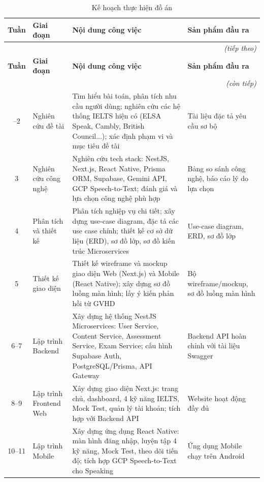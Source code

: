 \documentclass[a4paper,12pt]{extreport}
\begin{document}
\renewcommand{\arraystretch}{1.3}
\begin{longtable}{|c|p{4.0cm}|p{5.5cm}|p{3.5cm}|}
    \caption{Kế hoạch thực hiện đồ án}
    \label{tab:kehoach} \\
    \hline
    \textbf{Tuần} & \textbf{Giai đoạn} & \textbf{Nội dung công việc} & \textbf{Sản phẩm đầu ra} \\ \hline
    \endfirsthead
    \multicolumn{4}{r}{\footnotesize\textit{(tiếp theo)}} \\
    \hline
    \textbf{Tuần} & \textbf{Giai đoạn} & \textbf{Nội dung công việc} & \textbf{Sản phẩm đầu ra} \\ \hline
    \endhead
    \hline \multicolumn{4}{r}{\footnotesize\textit{(còn tiếp)}} \\
    \endfoot
    \hline
    \endlastfoot
    1--2 & Nghiên cứu đề tài & Tìm hiểu bài toán, phân tích nhu cầu người dùng; nghiên cứu các hệ thống IELTS hiện có (ELSA Speak, Cambly, British Council...); xác định phạm vi và mục tiêu đề tài & Tài liệu đặc tả yêu cầu sơ bộ \\ \hline
    3 & Nghiên cứu công nghệ & Nghiên cứu tech stack: NestJS, Next.js, React Native, Prisma ORM, Supabase, Gemini API, GCP Speech-to-Text; đánh giá và lựa chọn công nghệ phù hợp & Bảng so sánh công nghệ, báo cáo lý do lựa chọn \\ \hline
    4 & Phân tích và thiết kế & Phân tích nghiệp vụ chi tiết; xây dựng use-case diagram, đặc tả các use case chính; thiết kế cơ sở dữ liệu (ERD), sơ đồ lớp, sơ đồ kiến trúc Microservices & Use-case diagram, ERD, sơ đồ lớp \\ \hline
    5 & Thiết kế giao diện & Thiết kế wireframe và mockup giao diện Web (Next.js) và Mobile (React Native); xây dựng sơ đồ luồng màn hình; lấy ý kiến phản hồi từ GVHD & Bộ wireframe/mockup, sơ đồ luồng màn hình \\ \hline
    6--7 & Lập trình Backend & Xây dựng hệ thống NestJS Microservices: User Service, Content Service, Assessment Service, Exam Service; cấu hình Supabase Auth, PostgreSQL/Prisma, API Gateway & Backend API hoàn chỉnh với tài liệu Swagger \\ \hline
    8--9 & Lập trình Frontend Web & Xây dựng giao diện Next.js: trang chủ, dashboard, 4 kỹ năng IELTS, Mock Test, quản lý tài khoản; tích hợp với Backend API & Website hoạt động đầy đủ \\ \hline
    10--11 & Lập trình Mobile & Xây dựng ứng dụng React Native: màn hình đăng nhập, luyện tập 4 kỹ năng, Mock Test, theo dõi tiến độ; tích hợp GCP Speech-to-Text cho Speaking & Ứng dụng Mobile chạy trên Android \\ \hline

\end{longtable}
\end{document}
